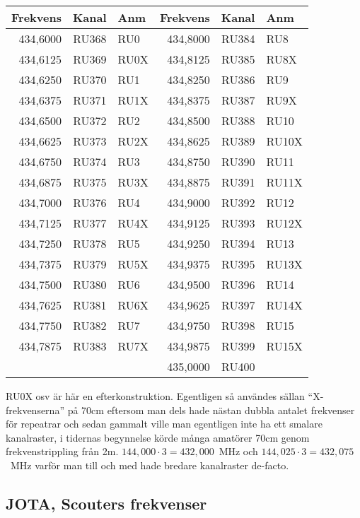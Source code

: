 
\clearpage
\begin{longtable}{rrl|rrl}
\textbf{Frekvens} & \textbf{Kanal} & \textbf{Anm}   
&  \textbf{Frekvens} & \textbf{Kanal} & \textbf{Anm} \\ \hline

434,6000 & RU368 & RU0  & 434,8000 & RU384 & RU8   \\
434,6125 & RU369 & RU0X & 434,8125 & RU385 & RU8X  \\
434,6250 & RU370 & RU1  & 434,8250 & RU386 & RU9   \\
434,6375 & RU371 & RU1X & 434,8375 & RU387 & RU9X  \\
434,6500 & RU372 & RU2  & 434,8500 & RU388 & RU10  \\
434,6625 & RU373 & RU2X & 434,8625 & RU389 & RU10X \\
434,6750 & RU374 & RU3  & 434,8750 & RU390 & RU11  \\
434,6875 & RU375 & RU3X & 434,8875 & RU391 & RU11X \\
434,7000 & RU376 & RU4  & 434,9000 & RU392 & RU12  \\
434,7125 & RU377 & RU4X & 434,9125 & RU393 & RU12X \\
434,7250 & RU378 & RU5  & 434,9250 & RU394 & RU13  \\
434,7375 & RU379 & RU5X & 434,9375 & RU395 & RU13X \\
434,7500 & RU380 & RU6  & 434,9500 & RU396 & RU14  \\
434,7625 & RU381 & RU6X & 434,9625 & RU397 & RU14X \\
434,7750 & RU382 & RU7  & 434,9750 & RU398 & RU15  \\
434,7875 & RU383 & RU7X & 434,9875 & RU399 & RU15X \\
         &       &      & 435,0000 & RU400 &       \\

\end{longtable}

RU0X osv är här en efterkonstruktion. Egentligen så användes sällan ``X-frekvenserna'' på 70cm eftersom man dels hade nästan dubbla antalet frekvenser för repeatrar och sedan gammalt ville man egentligen inte ha ett smalare kanalraster, i tidernas begynnelse körde många amatörer 70cm genom frekvenstrippling från 2m. $144,000 \cdot 3 = 432,000$~MHz och $144,025 \cdot 3 = 432,075$~MHz varför man till och med hade bredare kanalraster de-facto.

\clearpage

\subsection{JOTA, Scouters frekvenser}

